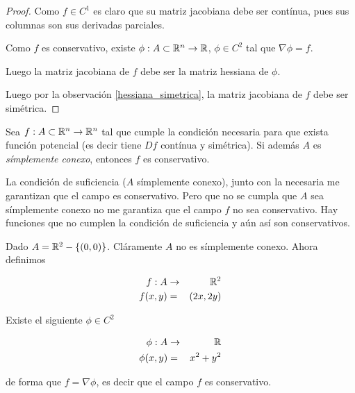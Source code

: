 \begin{proof}
Como $f \in C^1$ es claro que su matriz jacobiana debe ser contínua, pues sus columnas son sus derivadas parciales.

Como $f$ es conservativo, existe $\phi : A \subset \mathbb{R}^n \to \mathbb{R}$, $ \phi \in C^2$ tal que $\nabla \phi = f$.  

Luego la matriz jacobiana de $f$ debe ser la matriz hessiana de $\phi$. 

Luego por la observación \ref{hessiana_simetrica}, la matriz jacobiana de $f$ debe ser simétrica.
\end{proof}

\begin{theorem}[Suficiente] \label{suficiente_potencial} 
Sea $ f : A \subset \mathbb{R}^n \to \mathbb{R}^n$ tal que cumple la condición necesaria para que exista función potencial (es decir tiene $Df$ contínua y simétrica).  Si además $ A$ es \emph{símplemente conexo}, entonces $f$ es conservativo.
\end{theorem}

\begin{observation}
La condición de suficiencia ($A$ símplemente conexo), junto con la necesaria me garantizan que el campo es conservativo.  Pero que no se cumpla que $A$ sea símplemente conexo no me garantiza que el campo $f$ no sea conservativo.  Hay funciones que no cumplen la condición de suficiencia y aún así son conservativos.
\end{observation}

\begin{example}
Dado $ A = \mathbb{R}^2 - \{(0,0)\}$.  Cláramente $A$ no es símplemente conexo.  Ahora definimos

\begin{eqnarray*} f : A &\to& \mathbb{R}^2 \\
f(x,y) &=& (2x, 2y) \end{eqnarray*}

Existe el siguiente $\phi \in C^2$

\begin{eqnarray*} \phi : A &\to& \mathbb{R} \\
\phi(x,y) &=& x^2 + y^2 \end{eqnarray*}

de forma que $f = \nabla \phi$, es decir que el campo $f$ es conservativo.
\end{example}



